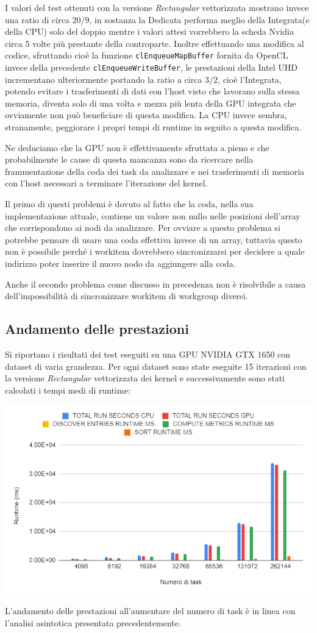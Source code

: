 \documentclass[../relazione.tex]{subfiles}
\begin{document}
I valori del test ottenuti con la versione \textit{Rectangular} vettorizzata mostrano invece una ratio di circa $20/9$, in sostanza la Dedicata performa meglio della Integrata(e della CPU) solo del doppio mentre i valori attesi vorrebbero la scheda Nvidia circa 5 volte più prestante della controparte.
Inoltre effettuando una modifica al codice, sfruttando cioè la funzione \lstinline{clEnqueueMapBuffer} fornita da OpenCL invece della precedente \lstinline{clEnqueueWriteBuffer}, le prestazioni della Intel UHD incrementano ulteriormente portando la ratio a circa $3/2$, cioè l'Integrata, potendo evitare i trasferimenti di dati con l'host visto che lavorano sulla stessa memoria, diventa solo di una volta e mezza più lenta della GPU integrata che ovviamente non può beneficiare di questa modifica.
La CPU invece sembra, stranamente, peggiorare i propri tempi di runtime in seguito a questa modifica.

Ne deduciamo che la GPU non è effettivamente sfruttata a pieno e che probabilmente le cause di questa mancanza sono da ricercare nella frammentazione della coda dei task da analizzare e nei trasferimenti di memoria con l'host necessari a terminare l'iterazione del kernel.

Il primo di questi problemi è dovuto al fatto che la coda, nella sua implementazione attuale, contiene un valore non nullo nelle posizioni dell'array che corrispondono ai nodi da analizzare. Per ovviare a questo problema si potrebbe pensare di usare una coda effettiva invece di un array, tuttavia questo non è possibile perché i workitem dovrebbero sincronizzarsi per decidere a quale indirizzo poter inserire il nuovo nodo da aggiungere alla coda.

Anche il secondo problema come discusso in precedenza non è risolvibile a causa dell'impossibilità di sincronizzare workitem di workgroup diversi.

\subsection{Andamento delle prestazioni}
Si riportano i risultati dei test eseguiti su una GPU NVIDIA GTX 1650 con dataset di varia grandezza. Per ogni dataset sono state eseguite 15 iterazioni con la versione \textit{Rectangular} vettorizzata dei kernel e successivamente sono stati calcolati i tempi medi di runtime:

\begin{center}
\includegraphics[scale=0.8]{images/andamento_prestazioni.png}
\end{center}

L'andamento delle prestazioni all'aumentare del numero di task è in linea con l'analisi asintotica presentata precedentemente. 
\end{document}
